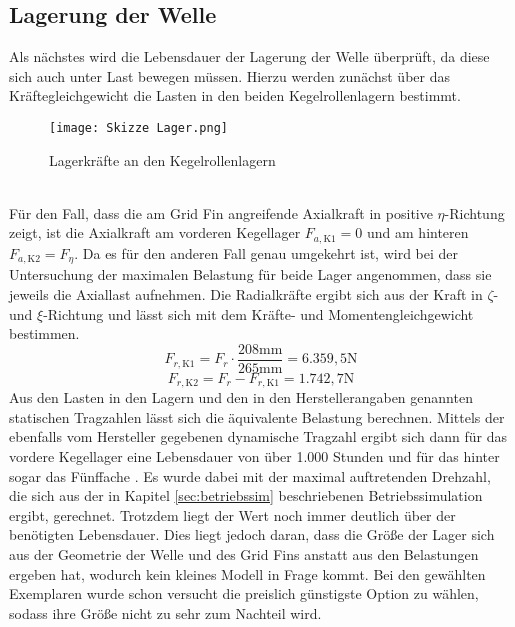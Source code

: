 \subsection{Lagerung der Welle}\label{sec:lagerWelle}
Als nächstes wird die Lebensdauer der Lagerung der Welle überprüft, da diese sich auch unter Last bewegen müssen. Hierzu werden zunächst über das Kräftegleichgewicht die Lasten in den beiden Kegelrollenlagern bestimmt.
\begin{figure}[h] 
	\centering
	\texttt{[image: Skizze Lager.png]}
	\caption{Lagerkräfte an den Kegelrollenlagern}
\end{figure}\\
Für den Fall, dass die am Grid Fin angreifende Axialkraft in positive $\eta$-Richtung zeigt, ist die Axialkraft am vorderen Kegellager $F_{a, \mathrm{K1}} = 0$ und am hinteren $F_{a, \mathrm{K2}} = F_\eta$. Da es für den anderen Fall genau umgekehrt ist, wird bei der Untersuchung der maximalen Belastung für beide Lager angenommen, dass sie jeweils die Axiallast aufnehmen. Die Radialkräfte ergibt sich aus der Kraft in $\zeta$- und $\xi$-Richtung und lässt sich mit dem Kräfte- und Momentengleichgewicht bestimmen.
\begin{equation}\label{eq_lagerWelle1}
	F_{r, \mathrm{K1}} = F_r\cdot\frac{208\mathrm{mm}}{265\mathrm{mm}}=6.359,5\mathrm{N}
\end{equation}
\begin{equation}\label{eq_lagerWelle2}
	F_{r, \mathrm{K2}} = F_r-F_{r, \mathrm{K1}}=1.742,7\mathrm{N}
\end{equation}
Aus den Lasten in den Lagern und den in den Herstellerangaben genannten statischen Tragzahlen lässt sich die äquivalente Belastung berechnen. Mittels der ebenfalls vom Hersteller gegebenen dynamische Tragzahl ergibt sich dann für das vordere Kegellager eine Lebensdauer von über 1.000 Stunden und für das hinter sogar das Fünffache \cite{metall}. Es wurde dabei mit der maximal auftretenden Drehzahl, die sich aus der in Kapitel \ref{sec:betriebssim} beschriebenen Betriebssimulation ergibt, gerechnet. Trotzdem liegt der Wert noch immer deutlich über der benötigten Lebensdauer. Dies liegt jedoch daran, dass die Größe der Lager sich aus der Geometrie der Welle und des Grid Fins anstatt aus den Belastungen ergeben hat, wodurch kein kleines Modell in Frage kommt. Bei den gewählten Exemplaren wurde schon versucht die preislich günstigste Option zu wählen, sodass ihre Größe nicht zu sehr zum Nachteil wird.
